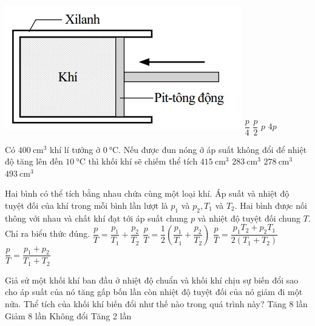 \begin{ex}
	{\includegraphics[width=0.5\linewidth]{../figs/G12C2-1}}
	\choice
	{$\dfrac{p}{4}$}
	{$\dfrac{p}{2}$}
	{$p$}
	{\True $4 p$}
	\loigiai{}
\end{ex}
\begin{ex}
	Có $\SI{400}{\centi\meter^3}$ khí lí tưởng ở $\SI{0}{\celsius}$. Nếu được đun nóng ở áp suất không đổi để nhiệt độ tăng lên đến $\SI{10}{\celsius}$ thì khối khí sẽ chiếm thể tích
	\choice
	{\True $\SI{415}{\centi\meter^3}$}
	{$\SI{283}{\centi\meter^3}$}
	{$\SI{278}{\centi\meter^3}$}
	{$\SI{493}{\centi\meter^3}$}
	\loigiai{}
\end{ex}
\begin{ex}
	Hai bình có thể tích bằng nhau chứa cùng một loại khí. Áp suất và nhiệt độ tuyệt đối của khí trong mỗi bình lần lượt là $p_1$ và $p_2, T_1$ và $T_2$. Hai bình được nối thông với nhau và chất khí đạt tới áp suất chung $p$ và nhiệt độ tuyệt đối chung $T$. Chỉ ra biểu thức đúng.
	\choice
	{$\dfrac{p}{T}=\dfrac{p_1}{T_1}+\dfrac{p_2}{T_2}$}
	{\True $\dfrac{p}{T}=\dfrac{1}{2}\left(\dfrac{p_1}{T_1}+\dfrac{p_2}{T_2}\right)$}
	{$\dfrac{p}{T}=\dfrac{p_1 T_2+p_2 T_1}{2\left(T_1+T_2\right)}$}
	{$\dfrac{p}{T}=\dfrac{p_1+p_2}{T_1+T_2}$}
	\loigiai{}
\end{ex}
\begin{ex}
	Giả sử một khối khí ban đầu ở nhiệt độ chuẩn và khối khí chịu sự biến đổi sao cho áp suất của nó tăng gấp bốn lần còn nhiệt độ tuyệt đối của nó giảm đi một nửa. Thể tích của khối khí biến đổi như thế nào trong quá trình này?
	\choice
	{Tăng 8 lần}
	{\True Giảm 8 lần}
	{Không đổi}
	{Tăng 2 lần}
	\loigiai{}
\end{ex}
